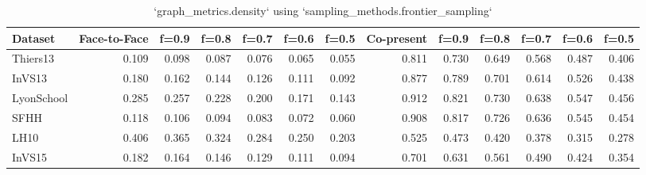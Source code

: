 \begin{table}[ht]
\begin{tabular}{lrrrrrrrrrrrr}
\hline
 Dataset    &   Face-to-Face &   f=0.9 &   f=0.8 &   f=0.7 &   f=0.6 &   f=0.5 &   Co-present &   f=0.9 &   f=0.8 &   f=0.7 &   f=0.6 &   f=0.5 \\
\hline
 Thiers13   &          0.109 &   0.098 &   0.087 &   0.076 &   0.065 &   0.055 &        0.811 &   0.730 &   0.649 &   0.568 &   0.487 &   0.406 \\
 InVS13     &          0.180 &   0.162 &   0.144 &   0.126 &   0.111 &   0.092 &        0.877 &   0.789 &   0.701 &   0.614 &   0.526 &   0.438 \\
 LyonSchool &          0.285 &   0.257 &   0.228 &   0.200 &   0.171 &   0.143 &        0.912 &   0.821 &   0.730 &   0.638 &   0.547 &   0.456 \\
 SFHH       &          0.118 &   0.106 &   0.094 &   0.083 &   0.072 &   0.060 &        0.908 &   0.817 &   0.726 &   0.636 &   0.545 &   0.454 \\
 LH10       &          0.406 &   0.365 &   0.324 &   0.284 &   0.250 &   0.203 &        0.525 &   0.473 &   0.420 &   0.378 &   0.315 &   0.278 \\
 InVS15     &          0.182 &   0.164 &   0.146 &   0.129 &   0.111 &   0.094 &        0.701 &   0.631 &   0.561 &   0.490 &   0.424 &   0.354 \\
\hline
\end{tabular}
\caption{`graph_metrics.density` using `sampling_methods.frontier_sampling`}
\end{table}